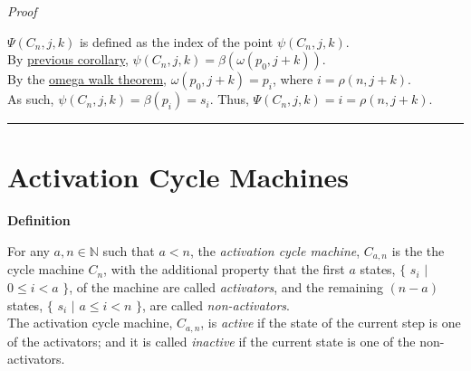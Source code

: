 \documentclass[a4paper,12pt]{article}
\begin{document}
\noindent
\textit{Proof}

\noindent $\Psi(C_n, j, k)$ is defined as the index of the point $\psi(C_n, j, k)$.\\

\noindent By \hyperlink{corollary:bridged_state_function}{previous corollary}, $\psi(C_n, j, k) = \beta(\omega(p_0, j + k))$.\\

\noindent By the \hyperlink{theorem:omega_walk_theorem}{omega walk theorem}, $\omega(p_0, j + k) = p_i$, where $i = \rho(n, j + k)$.\\

\noindent As such, $\psi(C_n, j, k) = \beta(p_i) = s_i$. Thus, $\Psi(C_n, j, k) = i = \rho(n, j + k)$.
 
\begin{center}
\noindent\rule{8cm}{0.4pt}
\end{center}





\section{Activation Cycle Machines}
\label{section:activation_cycle_machines}
\hypertarget{section:activation_cycle_machines}{}




\label{definition:state_position_function}
\hypertarget{definition:state_position_function}{}
\begin{tcolorbox}
\textbf{Definition}

\noindent For any $a, n \in \mathbb{N}$ such that $a < n$, the \textit{activation cycle machine}, $C_{a, n}$ is the the cycle machine $C_n$, with the additional property that the first $a$ states, $\{$ $s_i$ $|$ $0 \leq i < a$ $\}$, of the machine are called \textit{activators}, and the remaining $(n - a)$ states, $\{$ $s_i$ $|$ $a \leq i < n$ $\}$, are called \textit{non-activators}.\\

\noindent The activation cycle machine, $C_{a, n}$, is \textit{active} if the state of the current step is one of the activators; and it is called \textit{inactive} if the current state is one of the non-activators.

\end{tcolorbox}
\end{document}
